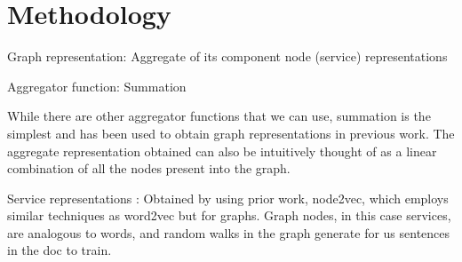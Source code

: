 \section{Methodology}
Graph representation:  Aggregate of its component node (service) representations

Aggregator function: Summation

While there are other aggregator functions that we can use, summation is the simplest and has been used to obtain graph representations in previous work. The aggregate representation obtained can also be intuitively thought of as a linear combination of all the nodes present into the graph. 

Service representations : Obtained by using prior work, node2vec, which employs similar techniques as word2vec but for graphs. Graph nodes, in this case services, are analogous to words, and random walks in the graph generate for us sentences in the doc to train.
